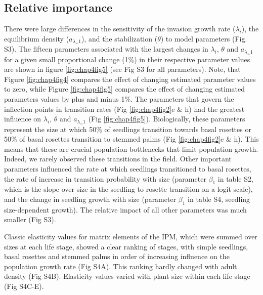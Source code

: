 \documentclass[b5paper,justified]{tufte-book} %
\begin{document}
\begin{fullwidth}
\subsection{Relative importance}

There were large differences in the sensitivity of the invasion growth rate ($\lambda_i$), the equilibrium density ($a_{\lambda_=1}$), and the stabilization ($\theta$) to model parameters (Fig. S3). The fifteen parameters associated with the largest changes in $\lambda_i$, $\theta$ and $a_{\lambda_=1}$ for a given small proportional change (1\%) in their respective parameter values are shown in figure \ref{fig:chap4fig5} (see Fig S3 for all parameters).  Note, that Figure \ref{fig:chap4fig4} compares the effect of changing estimated parameter values to zero, while Figure \ref{fig:chap4fig5} compares the effect of changing estimated parameters values by plus and minus 1\%.  The parameters that govern the inflection points in transition rates (Fig \ref{fig:chap4fig2}e \& h) had the greatest influence on $\lambda_i$, $\theta$ and $a_{\lambda_=1}$ (Fig \ref{fig:chap4fig5}).  Biologically, these parameters represent the size at which 50\% of seedlings transition towards basal rosettes or 50\% of basal rosettes transition to stemmed palms (Fig \ref{fig:chap4fig2}e \& h). This means that these are crucial population bottlenecks that limit population growth. Indeed, we rarely observed these transitions in the field. Other important parameters influenced the rate at which seedlings transitioned to basal rosettes, the rate of increase in transition probability with size (parameter $\beta_1$ in table S2, which is the slope over size in the seedling to rosette transition on a logit scale), and the change in seedling growth with size (parameter $\beta_1$ in table S4, seedling size-dependent growth). The relative impact of all other parameters was much smaller (Fig S3). 

Classic elasticity values for matrix elements of the IPM, which were summed over sizes at each life stage, showed a clear ranking of stages, with simple seedlings, basal rosettes and stemmed palms in order of increasing influence on the population growth rate (Fig S4A). This ranking hardly changed with adult density (Fig S4B). Elasticity values varied with plant size within each life stage (Fig S4C-E).


\end{fullwidth}
\end{document}
